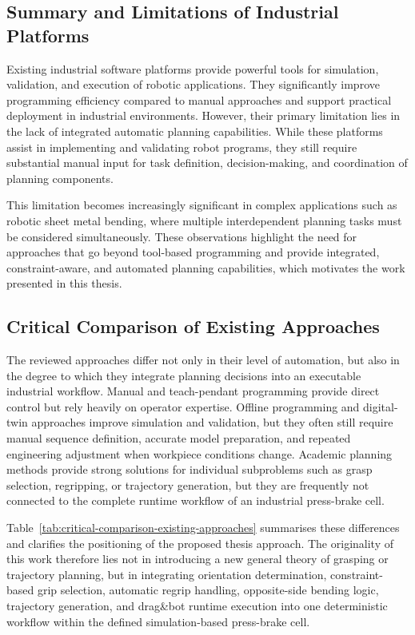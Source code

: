 \subsection{Summary and Limitations of Industrial Platforms}
\label{subsec:summary-limitations-industrial-platforms}

Existing industrial software platforms provide powerful tools for simulation, validation, and execution of robotic applications. They significantly improve programming efficiency compared to manual approaches and support practical deployment in industrial environments. However, their primary limitation lies in the lack of integrated automatic planning capabilities. While these platforms assist in implementing and validating robot programs, they still require substantial manual input for task definition, decision-making, and coordination of planning components.

This limitation becomes increasingly significant in complex applications such as robotic sheet metal bending, where multiple interdependent planning tasks must be considered simultaneously. These observations highlight the need for approaches that go beyond tool-based programming and provide integrated, constraint-aware, and automated planning capabilities, which motivates the work presented in this thesis.

\subsection{Critical Comparison of Existing Approaches}
\label{subsec:critical-comparison-existing-approaches}

The reviewed approaches differ not only in their level of automation, but also in the degree to which they integrate planning decisions into an executable industrial workflow. Manual and teach-pendant programming provide direct control but rely heavily on operator expertise. Offline programming and digital-twin approaches improve simulation and validation, but they often still require manual sequence definition, accurate model preparation, and repeated engineering adjustment when workpiece conditions change. Academic planning methods provide strong solutions for individual subproblems such as grasp selection, regripping, or trajectory generation, but they are frequently not connected to the complete runtime workflow of an industrial press-brake cell.

Table~\ref{tab:critical-comparison-existing-approaches} summarises these differences and clarifies the positioning of the proposed thesis approach. The originality of this work therefore lies not in introducing a new general theory of grasping or trajectory planning, but in integrating orientation determination, constraint-based grip selection, automatic regrip handling, opposite-side bending logic, trajectory generation, and drag\&bot runtime execution into one deterministic workflow within the defined simulation-based press-brake cell.


